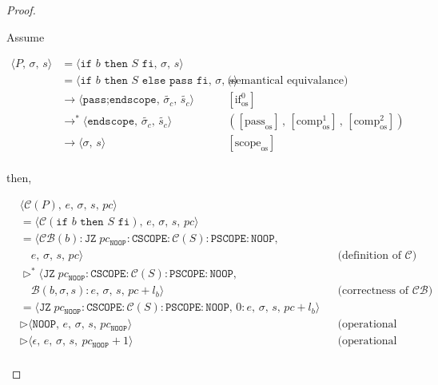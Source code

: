 \documentclass{article}
\begin{document}
\begin{proof}
\begin{itemize}
\begin{itemize}
            Assume

                \[
                  \begin{aligned}
                  \langle P,\, \sigma,\, s \rangle
                  &=\langle \texttt{if } b \texttt{ then } S \texttt{ fi},\, \sigma,\, s \rangle \\
                  &=\langle \texttt{if } b \texttt{ then } S \texttt{ else pass fi},\, \sigma,\, s \rangle 
                  && \text{(semantical equivalance)}\\
                  &\rightarrow \langle \texttt{pass;endscope},\, \tilde{\sigma_c} ,\, \tilde{s_c} \rangle
                  && [\text{if}^0_{\text{os}}]   \\
                  &\rightarrow^\ast \langle \texttt{endscope},\, \tilde{\sigma_c} ,\, \tilde{s_c} \rangle 
                  && ([\text{pass}_{\text{os}}] \,,\, [\text{comp}^1_{\text{os}}] \,,\, [\text{comp}^2_{\text{os}}])   \\
                  &\rightarrow \langle \sigma ,\, s \rangle
                  && [\text{scope}_{\text{os}}]   \\
                  \end{aligned}
              \]

            then,

            \[
              \begin{aligned}
              &\langle \mathcal{C}(P),\, e,\, \sigma,\, s,\, pc \rangle \\
              &= \langle \mathcal{C}(\texttt{if } b \texttt{ then } S \texttt{ fi}),\, e,\, \sigma,\, s,\, pc \rangle \\
              &= \langle \mathcal{CB}(b) : \texttt{JZ}\; pc_{\texttt{NOOP}} : \texttt{CSCOPE} : \mathcal{C}(S) : \texttt{PSCOPE} :\texttt{NOOP} ,\, \\
              &\quad e,\, \sigma,\, s,\, pc \rangle
              && \text{(definition of } \mathcal{C}\text{)} \\
              &\triangleright^\ast \langle \texttt{JZ}\; pc_{\texttt{NOOP}} : \texttt{CSCOPE} : \mathcal{C}(S) : \texttt{PSCOPE} :\texttt{NOOP} ,\, \\
              &\quad \mathcal{B}(b, \sigma, s) : e,\, \sigma,\, s,\, pc + l_b \rangle
              && \text{(correctness of } \mathcal{CB}\text{)} \\
              &= \langle \texttt{JZ}\; pc_{\texttt{NOOP}} : \texttt{CSCOPE} : \mathcal{C}(S) : \texttt{PSCOPE} :\texttt{NOOP} ,\, 0 : e,\, \sigma,\, s,\, pc + l_b \rangle \\  
              &\triangleright \langle \texttt{NOOP} ,\, e,\, \sigma,\, s,\, pc_{\texttt{NOOP}} \rangle
              && \text{(operational semantics)} \\
              &\triangleright \langle \epsilon ,\, e,\, \sigma,\, s,\ pc_{\texttt{NOOP}} + 1 \rangle
              && \text{(operational semantics)} \\ 
              \end{aligned}
          \]
                

\end{itemize}
\end{itemize}
\end{proof}
\end{document}
